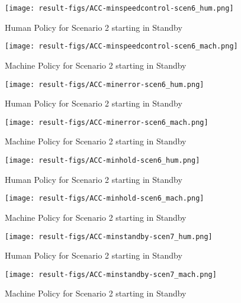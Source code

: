 \begin{figure}[h]
    \texttt{[image: result-figs/ACC-minspeedcontrol-scen6\_hum.png]}
    \caption{Human Policy for Scenario 2 starting in Standby}
    \label{fig:speedcontrol-s6-hum}
\end{figure}

\begin{figure}[h]
    \texttt{[image: result-figs/ACC-minspeedcontrol-scen6\_mach.png]}
    \caption{Machine Policy for Scenario 2 starting in Standby}
    \label{fig:speedcontrol-s6-mach}
\end{figure}

\begin{figure}[h]
    \texttt{[image: result-figs/ACC-minerror-scen6\_hum.png]}
    \caption{Human Policy for Scenario 2 starting in Standby}
    \label{fig:error-s6-hum}
\end{figure}

\begin{figure}[h]
    \texttt{[image: result-figs/ACC-minerror-scen6\_mach.png]}
    \caption{Machine Policy for Scenario 2 starting in Standby}
    \label{fig:error-s6-mach}
\end{figure}

\begin{figure}[h]
    \texttt{[image: result-figs/ACC-minhold-scen6\_hum.png]}
    \caption{Human Policy for Scenario 2 starting in Standby}
    \label{fig:hold-s6-hum}
\end{figure}

\begin{figure}[h]
    \texttt{[image: result-figs/ACC-minhold-scen6\_mach.png]}
    \caption{Machine Policy for Scenario 2 starting in Standby}
    \label{fig:hold-s6-mach}
\end{figure}

\begin{figure}[h]
    \texttt{[image: result-figs/ACC-minstandby-scen7\_hum.png]}
    \caption{Human Policy for Scenario 2 starting in Standby}
    \label{fig:standby-s7-hum}
\end{figure}

\begin{figure}[h]
    \texttt{[image: result-figs/ACC-minstandby-scen7\_mach.png]}
    \caption{Machine Policy for Scenario 2 starting in Standby}
    \label{fig:standby-s7-mach}
\end{figure}

